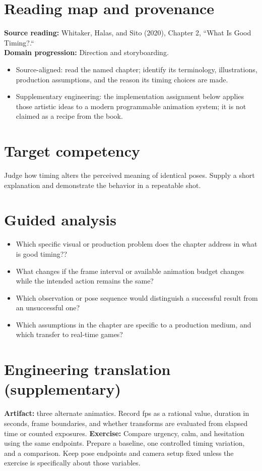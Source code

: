 \documentclass[10pt,letterpaper]{article}
\begin{document}
\makedoctitle
\makedocsummary

\section{Reading map and provenance}
\textbf{Source reading:} Whitaker, Halas, and Sito (2020), Chapter 2, ``What Is Good Timing?.``\\
\textbf{Domain progression:} Direction and storyboarding.
\begin{itemize}
\item Source-aligned: read the named chapter; identify its terminology, illustrations, production assumptions, and the reason its timing choices are made.
\item Supplementary engineering: the implementation assignment below applies those artistic ideas to a modern programmable animation system; it is not claimed as a recipe from the book.
\end{itemize}
\section{Target competency}
Judge how timing alters the perceived meaning of identical poses. Supply a short explanation and demonstrate the behavior in a repeatable shot.
\section{Guided analysis}
\begin{itemize}
\item Which specific visual or production problem does the chapter address in what is good timing??
\item What changes if the frame interval or available animation budget changes while the intended action remains the same?
\item Which observation or pose sequence would distinguish a successful result from an unsuccessful one?
\item Which assumptions in the chapter are specific to a production medium, and which transfer to real-time games?
\end{itemize}
\section{Engineering translation (supplementary)}
\textbf{Artifact:} three alternate animatics. Record fps as a rational value, duration in seconds, frame boundaries, and whether transforms are evaluated from elapsed time or counted exposures.
\textbf{Exercise:} Compare urgency, calm, and hesitation using the same endpoints. Prepare a baseline, one controlled timing variation, and a comparison. Keep pose endpoints and camera setup fixed unless the exercise is specifically about those variables.
\end{document}
